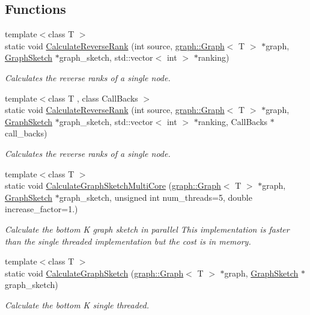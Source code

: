 \subsection*{Functions}
\begin{DoxyCompactItemize}
\item 
{\footnotesize template$<$class T $>$ }\\static void \hyperlink{namespaceall__distance__sketch_a025f777de5a9df1594dd306f9037f385}{Calculate\+Reverse\+Rank} (int source, \hyperlink{classall__distance__sketch_1_1graph_1_1Graph}{graph\+::\+Graph}$<$ T $>$ $\ast$graph, \hyperlink{classall__distance__sketch_1_1GraphSketch}{Graph\+Sketch} $\ast$graph\+\_\+sketch, std\+::vector$<$ int $>$ $\ast$ranking)
\begin{DoxyCompactList}\small\item\em Calculates the reverse ranks of a single node. \end{DoxyCompactList}\item 
{\footnotesize template$<$class T , class Call\+Backs $>$ }\\static void \hyperlink{namespaceall__distance__sketch_acd397719d04e49914cac475154a15735}{Calculate\+Reverse\+Rank} (int source, \hyperlink{classall__distance__sketch_1_1graph_1_1Graph}{graph\+::\+Graph}$<$ T $>$ $\ast$graph, \hyperlink{classall__distance__sketch_1_1GraphSketch}{Graph\+Sketch} $\ast$graph\+\_\+sketch, std\+::vector$<$ int $>$ $\ast$ranking, Call\+Backs $\ast$call\+\_\+backs)
\begin{DoxyCompactList}\small\item\em Calculates the reverse ranks of a single node. \end{DoxyCompactList}\item 
{\footnotesize template$<$class T $>$ }\\static void \hyperlink{namespaceall__distance__sketch_a7fea917111c3851d7c909e896fbad571}{Calculate\+Graph\+Sketch\+Multi\+Core} (\hyperlink{classall__distance__sketch_1_1graph_1_1Graph}{graph\+::\+Graph}$<$ T $>$ $\ast$graph, \hyperlink{classall__distance__sketch_1_1GraphSketch}{Graph\+Sketch} $\ast$graph\+\_\+sketch, unsigned int num\+\_\+threads=5, double increase\+\_\+factor=1.)
\begin{DoxyCompactList}\small\item\em Calculate the bottom K graph sketch in parallel This implementation is faster than the single threaded implementation but the cost is in memory. \end{DoxyCompactList}\item 
{\footnotesize template$<$class T $>$ }\\static void \hyperlink{namespaceall__distance__sketch_a1e07f2d9df73bee36e926822ce0bb2ea}{Calculate\+Graph\+Sketch} (\hyperlink{classall__distance__sketch_1_1graph_1_1Graph}{graph\+::\+Graph}$<$ T $>$ $\ast$graph, \hyperlink{classall__distance__sketch_1_1GraphSketch}{Graph\+Sketch} $\ast$graph\+\_\+sketch)
\begin{DoxyCompactList}\small\item\em Calculate the bottom K single threaded. \end{DoxyCompactList}\end{DoxyCompactItemize}


